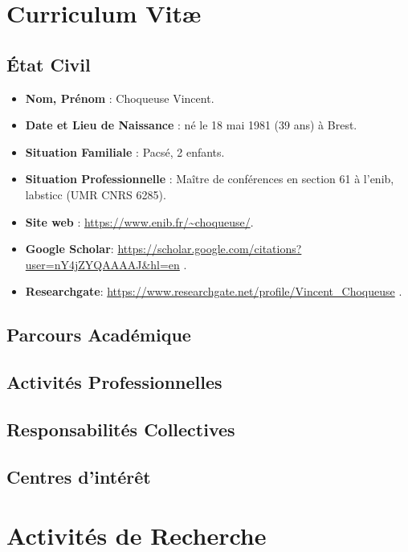 


\chapter{Curriculum Vit\ae}
\label{chapCV}

\section{\'Etat Civil}

\begin{itemize}
\item \textbf{Nom, Prénom }: Choqueuse Vincent.
\item \textbf{Date et Lieu de Naissance }: né le 18 mai 1981 (39 ans) à Brest.
\item \textbf{Situation Familiale }: Pacsé, 2 enfants.
\item \textbf{Situation Professionnelle }: Maître de conférences en section 61 à l'\gls{enib}, \gls{labsticc} (UMR CNRS 6285).
\item \textbf{Site web }: \url{https://www.enib.fr/~choqueuse/}.
\item \textbf{Google Scholar}: \url{https://scholar.google.com/citations?user=nY4jZYQAAAAJ&hl=en} .
\item \textbf{Researchgate}: \url{https://www.researchgate.net/profile/Vincent_Choqueuse} .
\end{itemize}

\section{Parcours Académique}


\section{Activités Professionnelles}

\section{Responsabilités Collectives}


\section{Centres d'intérêt}

\chapter{Activités de Recherche}
\label{chapAR}

